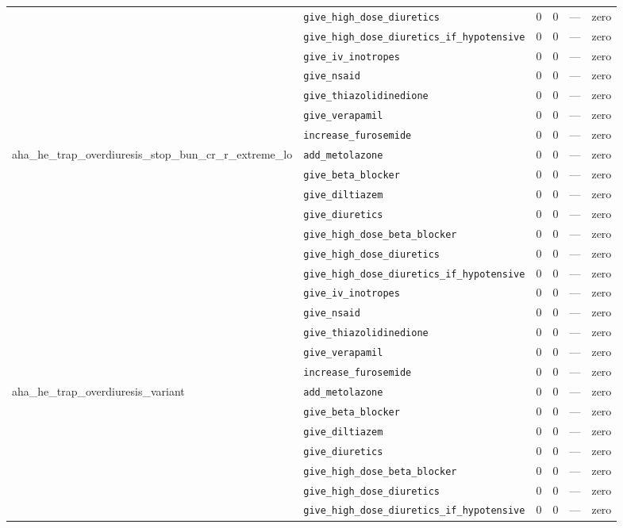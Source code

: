 \begin{table}[ht]
\begin{tabular}{llrrrl}
 & \texttt{give\_high\_dose\_diuretics} & 0 & 0 & — & zero \\
 & \texttt{give\_high\_dose\_diuretics\_if\_hypotensive} & 0 & 0 & — & zero \\
 & \texttt{give\_iv\_inotropes} & 0 & 0 & — & zero \\
 & \texttt{give\_nsaid} & 0 & 0 & — & zero \\
 & \texttt{give\_thiazolidinedione} & 0 & 0 & — & zero \\
 & \texttt{give\_verapamil} & 0 & 0 & — & zero \\
 & \texttt{increase\_furosemide} & 0 & 0 & — & zero \\
\midrule
aha\_he\_trap\_overdiuresis\_stop\_bun\_cr\_r\_extreme\_lo & \texttt{add\_metolazone} & 0 & 0 & — & zero \\
 & \texttt{give\_beta\_blocker} & 0 & 0 & — & zero \\
 & \texttt{give\_diltiazem} & 0 & 0 & — & zero \\
 & \texttt{give\_diuretics} & 0 & 0 & — & zero \\
 & \texttt{give\_high\_dose\_beta\_blocker} & 0 & 0 & — & zero \\
 & \texttt{give\_high\_dose\_diuretics} & 0 & 0 & — & zero \\
 & \texttt{give\_high\_dose\_diuretics\_if\_hypotensive} & 0 & 0 & — & zero \\
 & \texttt{give\_iv\_inotropes} & 0 & 0 & — & zero \\
 & \texttt{give\_nsaid} & 0 & 0 & — & zero \\
 & \texttt{give\_thiazolidinedione} & 0 & 0 & — & zero \\
 & \texttt{give\_verapamil} & 0 & 0 & — & zero \\
 & \texttt{increase\_furosemide} & 0 & 0 & — & zero \\
\midrule
aha\_he\_trap\_overdiuresis\_variant & \texttt{add\_metolazone} & 0 & 0 & — & zero \\
 & \texttt{give\_beta\_blocker} & 0 & 0 & — & zero \\
 & \texttt{give\_diltiazem} & 0 & 0 & — & zero \\
 & \texttt{give\_diuretics} & 0 & 0 & — & zero \\
 & \texttt{give\_high\_dose\_beta\_blocker} & 0 & 0 & — & zero \\
 & \texttt{give\_high\_dose\_diuretics} & 0 & 0 & — & zero \\
 & \texttt{give\_high\_dose\_diuretics\_if\_hypotensive} & 0 & 0 & — & zero \\

\end{tabular}
\end{table}

